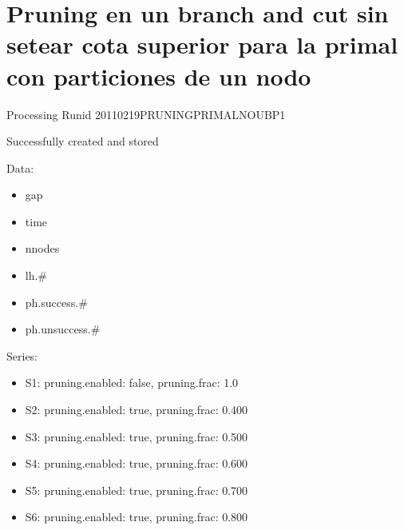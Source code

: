 \documentclass[landscape, 12pt]{report}
\begin{document}
\clearpage

\section*{Pruning en un branch and cut sin setear cota superior para la primal con particiones de un nodo}

Processing Runid 20110219PRUNINGPRIMALNOUBP1

Successfully created and stored

Data:
\begin{itemize}
\item gap
\item time
\item nnodes
\item lh.\#
\item ph.success.\#
\item ph.unsuccess.\#
\end{itemize}
Series:
\begin{itemize}
\item S1: pruning.enabled: false, pruning.frac: 1.0
\item S2: pruning.enabled: true, pruning.frac: 0.400
\item S3: pruning.enabled: true, pruning.frac: 0.500
\item S4: pruning.enabled: true, pruning.frac: 0.600
\item S5: pruning.enabled: true, pruning.frac: 0.700
\item S6: pruning.enabled: true, pruning.frac: 0.800
\end{itemize}
\end{document}
